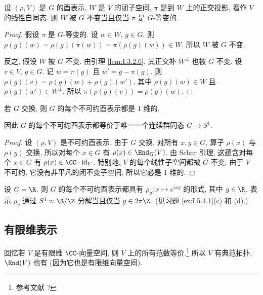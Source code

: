 \begin{lemma}[正交投影的等变性]
\label{lem:I.3.4.3}
设 $(\rho, V)$ 是 $G$ 的酉表示, $W$ 是 $V$ 的闭子空间, $\pi$ 是到 $W$ 上的正交投影, 看作 $V$ 的线性自同态.
则 $W$ 被 $G$ 不变当且仅当 $\pi$ 是 $G$-等变的.
\end{lemma}

\begin{proof}
假设 $\pi$ 是 $G$-等变的. 设 $w \in W$, $g \in G$. 则 $\rho(g)(w) = \rho(g)(\pi(w)) = \pi(\rho(g)(w)) \in W$. 所以 $W$ 被 $G$ 不变.

反之, 假设 $W$ 被 $G$ 不变. 由引理 \ref{lem:I.3.2.6}, 其正交补 $W^{\perp}$ 也被 $G$ 不变. 设 $v \in V$, $g \in G$. 记 $w = \pi(g)$ 且 $w' = g - \pi(g)$. 则 $\rho(g)(v) = \rho(g)(w) + \rho(g)(w')$, 其中 $\rho(g)(w) \in W$ 且 $\rho(g)(w') \in W^{\perp}$, 所以 $\pi(\rho(g)(v)) = \rho(g)(w)$.
\end{proof}

\begin{corollary}[交换群的不可约酉表示]
\label{cor:I.3.4.4}
若 $G$ 交换, 则 $G$ 的每个不可约酉表示都是 $1$ 维的.
\end{corollary}

因此 $G$ 的每个不可约酉表示都等价于唯一一个连续群同态 $G \to S^1$.

\begin{proof}
设 $(\rho, V)$ 是不可约酉表示. 由于 $G$ 交换, 对所有 $x, y \in G$, 算子 $\rho(x)$ 与 $\rho(y)$ 交换, 所以对每个 $x \in G$ 有 $\rho(x) \in \End_G(V)$. 由 Schur 引理, 这蕴含对每个 $x \in G$ 有 $\rho(x) \in \CC \cdot \mathrm{id}_V$. 特别地, $V$ 的每个线性子空间都被 $G$ 不变. 由于 $V$ 不可约, 它没有非平凡的闭不变子空间, 所以它必是 $1$ 维的.
\end{proof}

\begin{example}[$\R$ 的不可约酉表示]
\label{exa:I.3.4.5}
设 $G = \R$. 则 $G$ 的每个不可约酉表示都具有 $\rho_y \colon x \longmapsto e^{ixy}$ 的形式, 其中 $y \in \R$. 表示 $\rho_y$ 通过 $S^1 \simeq \R/\Z$ 分解当且仅当 $y \in 2\pi\Z$. (见习题 \ref{ex:I.5.4.1}(c) 和 (d).)
\end{example}

\subsection{有限维表示}

回忆若 $V$ 是有限维 $\CC$-向量空间, 则 $V$ 上的所有范数等价.\footnote{参考文献 ?} 所以 $V$ 有典范拓扑, $\End(V)$ 也有 (因为它也是有限维向量空间).

